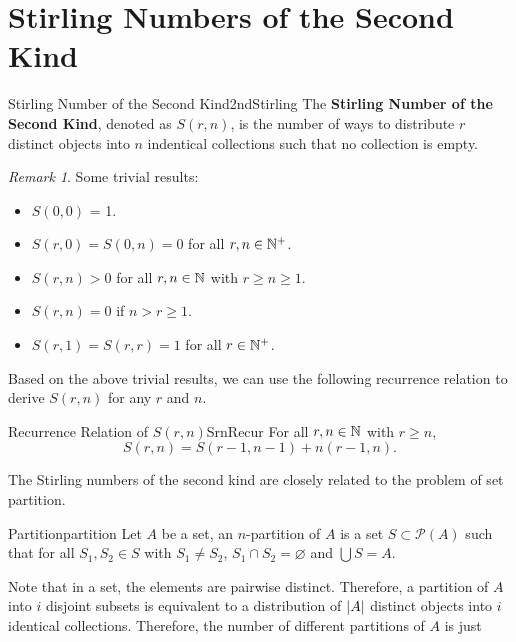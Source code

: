 \documentclass[math]{amznotes}
\theoremstyle{remark}
\newtheorem*{remark}{Remark}
\begin{document}
\section{Stirling Numbers of the Second Kind}
\begin{dfnbox}{Stirling Number of the Second Kind}{2ndStirling}
    The {\color{red} \textbf{Stirling Number of the Second Kind}}, denoted as $S(r, n)$, is the number of ways to distribute $r$ distinct objects into $n$ indentical collections such that no collection is empty.
\end{dfnbox}
\begin{notebox}
    \begin{remark}
        Some trivial results:
        \begin{itemize}
            \item $S(0, 0)$ = 1.
            \item $S(r, 0) = S(0, n) = 0$ for all $r, n \in \mathbb{N}^+$.
            \item $S(r, n) > 0$ for all $r, n \in \mathbb{N}$ with $r \geq n \geq 1$.
            \item $S(r, n) = 0$ if $n > r \geq 1$.
            \item $S(r, 1) = S(r, r) = 1$ for all $r \in \mathbb{N}^+$.
        \end{itemize}
    \end{remark}
\end{notebox}
Based on the above trivial results, we can use the following recurrence relation to derive $S(r, n)$ for any $r$ and $n$.
\begin{thmbox}{Recurrence Relation of $S(r, n)$}{SrnRecur}
    For all $r, n \in \mathbb{N}$ with $r \geq n$,
    \begin{equation*}
        S(r, n) = S(r - 1, n - 1) + n(r - 1, n).
    \end{equation*}
\end{thmbox}
The Stirling numbers of the second kind are closely related to the problem of set partition.
\begin{dfnbox}{Partition}{partition}
    Let $A$ be a set, an $n$-partition of $A$ is a set $S \subset \mathcal{P}(A)$ such that for all $S_1, S_2 \in S$ with $S_1 \neq S_2$, $S_1 \cap S_2 = \varnothing$ and $\bigcup S = A$.
\end{dfnbox}
Note that in a set, the elements are pairwise distinct. Therefore, a partition of $A$ into $i$ disjoint subsets is equivalent to a distribution of ${\left\lvert {A} \right\rvert}$ distinct objects into $i$ identical collections. Therefore, the number of different partitions of $A$ is just
\end{document}
